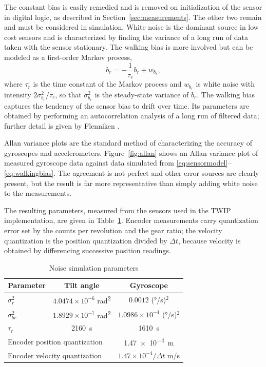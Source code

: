 The constant bias is easily remedied and is removed on initialization of the
sensor in digital logic, as described in Section~\ref{sec:measurements}. The
other two remain and must be considered in simulation. White noise is the
dominant source in low cost sensors and is characterized by finding the variance
of a long run of data taken with the sensor stationary. The walking bias is more
involved but can be modeled as a first-order Markov process,
\begin{equation}\label{eq:walkingbias}
\dot b_r=-\frac{1}{\tau_r}b_r+w_{b_r},
\end{equation}
where $\tau_r$ is the time constant of the Markov process and $w_{b_r}$ is white
noise with intensity $2\sigma_{b_r}^2/\tau_r$, so that $\sigma_{b_r}^2$ is the
steady-state variance of $b_r$. The walking bias captures the tendency of
the sensor bias to drift over time. Its parameters are obtained by performing an
autocorrelation analysis of a long run of filtered data; further detail is given
by Flenniken \cite{flenniken2005modeling}.

Allan variance plots are the standard method of characterizing the accuracy of
gyroscopes and accelerometers. Figure~\ref{fig:allan} shows an Allan variance
plot of measured gyroscope data against data simulated from
\eqref{eq:sensormodel}--\eqref{eq:walkingbias}. The agreement is not perfect and
other error sources are clearly present, but the result is far more
representative than simply adding white noise to the measurements.

The resulting parameters, measured from the sensors used in the TWIP
implementation, are given in Table~\ref{tab:noise}. Encoder measurements carry
quantization error set by the counts per revolution and the gear ratio; the
velocity quantization is the position quantization divided by $\Delta t$,
because velocity is obtained by differencing successive position readings.

\begin{table}[htbp]
\centering
\caption{Noise simulation parameters}
\label{tab:noise}
\begin{tabular}{lcc}
\toprule
Parameter & Tilt angle & Gyroscope \\
\midrule
$\sigma_r^2$    & $4.0474\times10^{-6}$ \si{rad^2}
                & $0.0012$ (\si{\degree/s})$^2$ \\
$\sigma_{br}^2$ & $1.8929\times10^{-7}$ \si{rad^2}
                & $1.0986\times10^{-4}$ (\si{\degree/s})$^2$ \\
$\tau_r$        & \SI{2160}{s} & \SI{1610}{s} \\
\midrule
\multicolumn{2}{l}{Encoder position quantization}
                & \SI{1.47e-4}{m} \\
\multicolumn{2}{l}{Encoder velocity quantization}
                & $1.47\times10^{-4}/\Delta t$ \si{m/s} \\
\bottomrule
\end{tabular}
\end{table}

